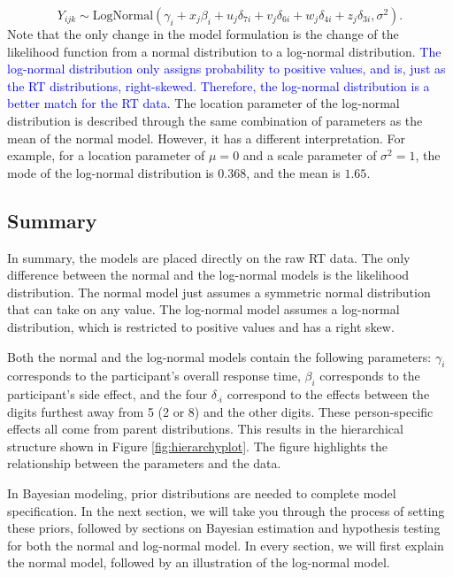 \documentclass[
  english,
  doc,floatsintext]{apa6}
\begin{document}
\begin{equation}
Y_{ijk} \sim \text{LogNormal}(\gamma_{i} + x_j \beta_{i} + u_j \delta_{7i} + v_j \delta_{6i} + w_j \delta_{4i} + z_j \delta_{3i}, \sigma^2).  
\end{equation}
Note that the only change in the model formulation is the change of the likelihood function from a normal distribution to a log-normal distribution. \textcolor{blue}{The log-normal distribution only assigns probability to positive values, and is, just as the RT distributions, right-skewed. Therefore, the log-normal distribution is a better match for the RT data.} The location parameter of the log-normal distribution is described through the same combination of parameters as the mean of the normal model. However, it has a different interpretation. For example, for a location parameter of \(\mu = 0\) and a scale parameter of \(\sigma^2 = 1\), the mode of the log-normal distribution is \(0.368\), and the mean is \(1.65\).

\hypertarget{summary}{%
\subsection{Summary}\label{summary}}

In summary, the models are placed directly on the raw RT data. The only difference between the normal and the log-normal models is the likelihood distribution. The normal model just assumes a symmetric normal distribution that can take on any value. The log-normal model assumes a log-normal distribution, which is restricted to positive values and has a right skew.

Both the normal and the log-normal models contain the following parameters: \(\gamma_i\) corresponds to the participant's overall response time, \(\beta_i\) corresponds to the participant's side effect, and the four \(\delta_{\cdot i}\) correspond to the effects between the digits furthest away from 5 (2 or 8) and the other digits. These person-specific effects all come from parent distributions. This results in the hierarchical structure shown in Figure \ref{fig:hierarchyplot}. The figure highlights the relationship between the parameters and the data.

In Bayesian modeling, prior distributions are needed to complete model specification. In the next section, we will take you through the process of setting these priors, followed by sections on Bayesian estimation and hypothesis testing for both the normal and log-normal model. In every section, we will first explain the normal model, followed by an illustration of the log-normal model.
\end{document}
